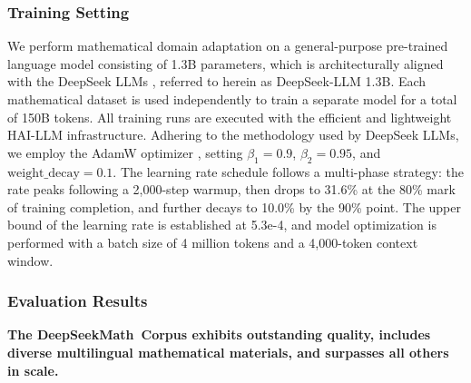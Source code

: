 \subsubsection{Training Setting}
\label{sec:quality-policy}
We perform mathematical domain adaptation on a general-purpose pre-trained language model consisting of 1.3B parameters, which is architecturally aligned with the DeepSeek LLMs \citep{deepseek-llm}, referred to herein as DeepSeek-LLM 1.3B. Each mathematical dataset is used independently to train a separate model for a total of 150B tokens. All training runs are executed with the efficient and lightweight HAI-LLM \citep{haillm} infrastructure. Adhering to the methodology used by DeepSeek LLMs, we employ the AdamW optimizer \citep{adamW}, setting $\beta_1=0.9$, $\beta_2=0.95$, and $\mathrm{weight\_decay}=0.1$. The learning rate schedule follows a multi-phase strategy: the rate peaks following a 2,000-step warmup, then drops to 31.6\% at the 80\% mark of training completion, and further decays to 10.0\% by the 90\% point. The upper bound of the learning rate is established at 5.3e-4, and model optimization is performed with a batch size of 4 million tokens and a 4,000-token context window.

\subsubsection{Evaluation Results}

\textbf{The DeepSeekMath~Corpus exhibits outstanding quality, includes diverse multilingual mathematical materials, and surpasses all others in scale.}

